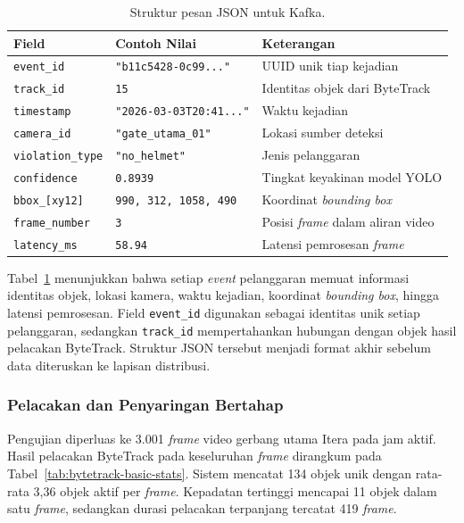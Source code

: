 \begin{table}[htbp]
\centering
\caption{Struktur pesan JSON untuk Kafka.}
\label{tab:json-output}
\footnotesize
\setlength{\tabcolsep}{4pt}
\begin{tabular}{p{} p{} p{}}
\toprule
\textbf{Field} & \textbf{Contoh Nilai} & \textbf{Keterangan} \\
\midrule
\texttt{event\_id}     & \texttt{"b11c5428-0c99..."}    & UUID unik tiap kejadian \\
\texttt{track\_id}     & \texttt{15}                    & Identitas objek dari ByteTrack \\
\texttt{timestamp}     & \texttt{"2026-03-03T20:41..."} & Waktu kejadian \\
\texttt{camera\_id}    & \texttt{"gate\_utama\_01"}     & Lokasi sumber deteksi \\
\texttt{violation\_type} & \texttt{"no\_helmet"}         & Jenis pelanggaran \\
\texttt{confidence}    & \texttt{0.8939}                & Tingkat keyakinan model YOLO \\
\texttt{bbox\_[xy12]}  & \texttt{990, 312, 1058, 490}   & Koordinat \textit{bounding box} \\
\texttt{frame\_number} & \texttt{3}                     & Posisi \textit{frame} dalam aliran video \\
\texttt{latency\_ms}   & \texttt{58.94}                 & Latensi pemrosesan \textit{frame} \\
\bottomrule
\end{tabular}
\end{table}

Tabel~\ref{tab:json-output} menunjukkan bahwa setiap \textit{event} pelanggaran memuat informasi identitas objek, lokasi kamera, waktu kejadian, koordinat \textit{bounding box}, hingga latensi pemrosesan. Field \texttt{event\_id} digunakan sebagai identitas unik setiap pelanggaran, sedangkan \texttt{track\_id} mempertahankan hubungan dengan objek hasil pelacakan ByteTrack. Struktur JSON tersebut menjadi format akhir sebelum data diteruskan ke lapisan distribusi.

\subsubsection{Pelacakan dan Penyaringan Bertahap}
\label{subsubsec:hasil-persistensi}

Pengujian diperluas ke 3.001 \textit{frame} video gerbang utama Itera pada jam aktif. Hasil pelacakan ByteTrack pada keseluruhan \textit{frame} dirangkum pada Tabel~\ref{tab:bytetrack-basic-stats}. Sistem mencatat 134 objek unik dengan rata-rata 3,36 objek aktif per \textit{frame}. Kepadatan tertinggi mencapai 11 objek dalam satu \textit{frame}, sedangkan durasi pelacakan terpanjang tercatat 419 \textit{frame}.


